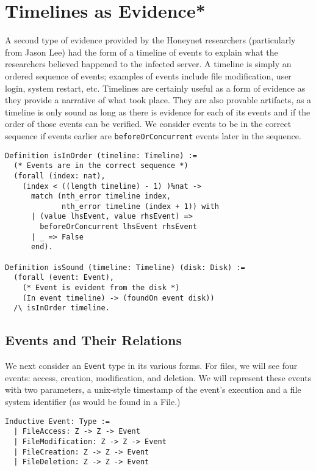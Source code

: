 \documentclass[nocopyrightspace]{sigplanconf}
\begin{document}
\section{Timelines as Evidence*}
\label{sec:timelines}

A second type of evidence provided by the Honeynet researchers (particularly
from Jason Lee\cite{lee}) had the form of a timeline of events to explain
what the researchers believed happened to the infected server. A timeline is
simply an ordered sequence of events; examples of events include file
modification, user login, system restart, etc. Timelines are certainly useful
as a form of evidence as they provide a narrative of what took place. They are
also provable artifacts, as a timeline is only sound as long as there is
evidence for each of its events and if the order of those events can be
verified. We consider events to be in the correct sequence if events earlier
are {\tt beforeOrConcurrent} events later in the sequence.

\begin{lstlisting}
Definition isInOrder (timeline: Timeline) :=
  (* Events are in the correct sequence *)
  (forall (index: nat),
    (index < ((length timeline) - 1) )%nat ->
      match (nth_error timeline index, 
             nth_error timeline (index + 1)) with
      | (value lhsEvent, value rhsEvent) => 
        beforeOrConcurrent lhsEvent rhsEvent
      | _ => False
      end).

Definition isSound (timeline: Timeline) (disk: Disk) :=
  (forall (event: Event),
    (* Event is evident from the disk *)
    (In event timeline) -> (foundOn event disk))
  /\ isInOrder timeline.
\end{lstlisting}

\subsection{Events and Their Relations}

We next consider an {\tt Event} type in its various forms. For files, we will
see four events: access, creation, modification, and deletion. We will
represent these events with two parameters, a unix-style timestamp of the
event's execution and a file system identifier (as would be found in a File.)

\begin{lstlisting}
Inductive Event: Type :=
  | FileAccess: Z -> Z -> Event
  | FileModification: Z -> Z -> Event
  | FileCreation: Z -> Z -> Event
  | FileDeletion: Z -> Z -> Event
\end{lstlisting}
\end{document}

